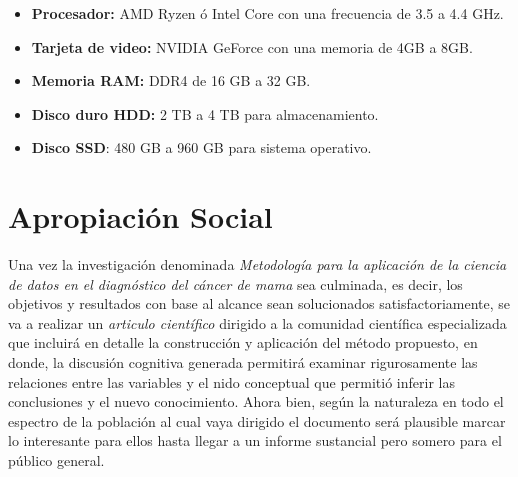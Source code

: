 \begin{itemize}
	\item \textbf{Procesador:} AMD Ryzen ó Intel Core con una frecuencia de 3.5 a 4.4 GHz.
	\item \textbf{Tarjeta de video:} NVIDIA GeForce con una memoria de 4GB a 8GB. 
	\item \textbf{Memoria RAM:} DDR4 de 16 GB a 32 GB.
	\item \textbf{Disco duro HDD:} 2 TB a 4 TB para almacenamiento.
	\item \textbf{Disco SSD}: 480 GB a 960 GB para sistema operativo.
\end{itemize} 

\newpage
\section{Apropiación Social}

Una vez la investigación denominada \textit{Metodología para la aplicación de la ciencia de datos en el diagnóstico del cáncer de mama } sea culminada, es decir, los objetivos y resultados con base al alcance sean solucionados satisfactoriamente, se va a realizar un \textit{articulo científico} dirigido a la comunidad científica especializada que incluirá en detalle la construcción y aplicación del método propuesto, en donde, la discusión cognitiva generada permitirá examinar rigurosamente las relaciones entre las variables y el nido conceptual que permitió inferir las conclusiones y el nuevo conocimiento. Ahora bien, según la naturaleza en todo el espectro de la población al cual vaya dirigido el documento será plausible marcar lo interesante para ellos hasta llegar a un informe sustancial pero somero para el público general.



